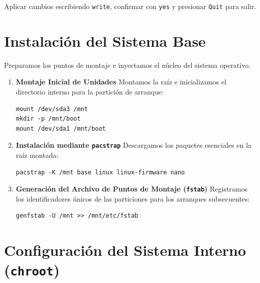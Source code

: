 \begin{nota}[]
    Aplicar cambios escribiendo \texttt{write}, confirmar con \texttt{yes} y presionar \texttt{Quit} para salir.
\end{nota}

\newpage

\section{Instalación del Sistema Base}
Preparamos los puntos de montaje e inyectamos el núcleo del sistema operativo.

\begin{enumerate}
\item [$\bullet$] \textbf{Montaje Inicial de Unidades}
Montamos la raíz e inicializamos el directorio interno para la partición de arranque:
\begin{lstlisting}
mount /dev/sda3 /mnt
mkdir -p /mnt/boot
mount /dev/sda1 /mnt/boot
\end{lstlisting}

\item [$\bullet$] \textbf{Instalación mediante \texttt{pacstrap}}
Descargamos los paquetes esenciales en la raíz montada:
\begin{lstlisting}
pacstrap -K /mnt base linux linux-firmware nano
\end{lstlisting}

\item [$\bullet$] \textbf{Generación del Archivo de Puntos de Montaje (\texttt{fstab})}
Registramos los identificadores únicos de las particiones para los arranques subsecuentes:
\begin{lstlisting}
genfstab -U /mnt >> /mnt/etc/fstab
\end{lstlisting}
\end{enumerate}

\section{Configuración del Sistema Interno (\texttt{chroot})}

